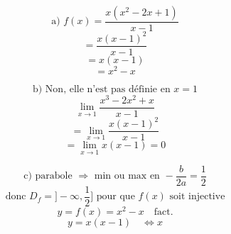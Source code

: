 \documentclass{article}
\begin{document}
\[ \text{a) } f(x) = \frac{x(x^2 - 2x + 1)}{x-1} \]
\[ = \frac{x(x-1)^2}{x-1} \]
\[ = x(x-1) \]
\[ = x^2 - x \]

\[ \text{b) Non, elle n'est pas définie en } x=1 \]
\[ \lim_{x \to 1} \frac{x^3 - 2x^2 + x}{x-1} \]
\[ = \lim_{x \to 1} \frac{x(x-1)^2}{x-1} \]
\[ = \lim_{x \to 1} x(x-1) = 0 \]

\[ \text{c) parabole } \Rightarrow \text{ min ou max en } -\frac{b}{2a} = \frac{1}{2} \]
\[ \text{donc } D_f = ]-\infty, \frac{1}{2}] \text{ pour que } f(x) \text{ soit injective} \]
\[ y = f(x) = x^2 - x \quad \text{fact.} \]
\[ y = x(x-1) \quad \Leftrightarrow x \]
\end{document}
